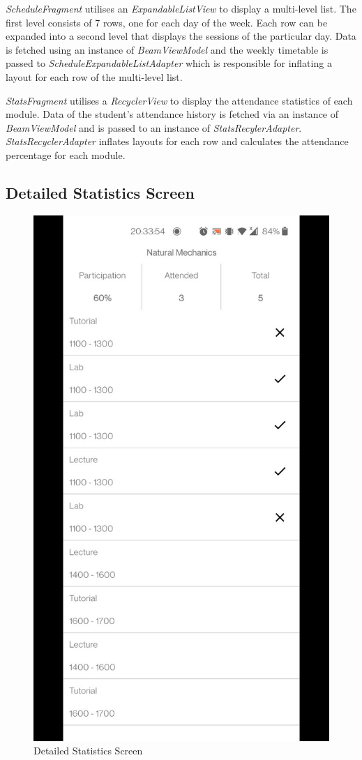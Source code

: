 \documentclass[../report.tex]{subfiles}
\begin{document}






\textit{ScheduleFragment} utilises an \textit{ExpandableListView} to display a multi-level list. The first level consists of 7 rows, one for each day of the week. Each row can be expanded into a second level that displays the sessions of the particular day. Data is fetched using an instance of \textit{BeamViewModel} and the weekly timetable is passed to \textit{ScheduleExpandableListAdapter} which is responsible for inflating a layout for each row of the multi-level list.

\textit{StatsFragment} utilises a \textit{RecyclerView} to display the attendance statistics of each module. Data of the student’s attendance history is fetched via an instance of \textit{BeamViewModel} and is passed to an instance of \textit{StatsRecylerAdapter}. \textit{StatsRecyclerAdapter} inflates layouts for each row and calculates the attendance percentage for each module.

\subsection{Detailed Statistics Screen}
\begin{figure}[H]
	\centering
	\includegraphics[width=.28\linewidth]{../images/07/02-app-dstats.jpg}
	\caption{Detailed Statistics Screen}
	\label{fig:app-dstats-screen}
\end{figure}
\end{document}
